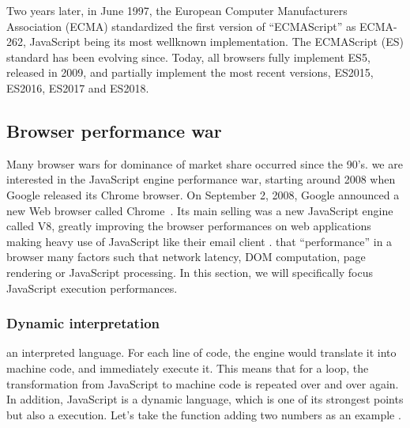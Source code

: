 Two years later, in June 1997, the European Computer Manufacturers Association
(ECMA) standardized the first version of ``ECMAScript'' as ECMA-262,
JavaScript being its most well\add{-}known implementation.
The ECMAScript (ES) standard has been evolving  since.
Today, all browsers fully implement ES5, released in 2009,
and partially implement the most recent versions, ES2015,
ES2016, ES2017 and ES2018.

\subsection{Browser performance war}%
\label{sub:browser_performance_war}

Many browser wars for dominance of market share occurred since the 90's.
we are  interested in the JavaScript engine performance war,
starting around 2008 when Google released its Chrome browser.
On September 2, 2008, Google announced a new Web browser called Chrome~\cite{google-chrome}.
Its main selling  was a new JavaScript engine called V8,
greatly improving the browser performances on web applications making
heavy use of JavaScript like their email client .
 that ``performance'' in a browser  many factors
such that network latency, DOM computation, page rendering or JavaScript processing.
In this section, we will specifically focus  JavaScript execution performances.

\subsubsection{Dynamic interpretation}%
\label{ssub:dynamic-interpretation}

 an interpreted language.
For each line of code, the engine would translate it into machine code,
and immediately execute it.
This means that for a loop, the  transformation from JavaScript to machine code
is repeated over and over again.
In addition, JavaScript is a dynamic language, which is  one of its
strongest points but also a  execution.
Let's take the function adding two numbers  as an example
.



